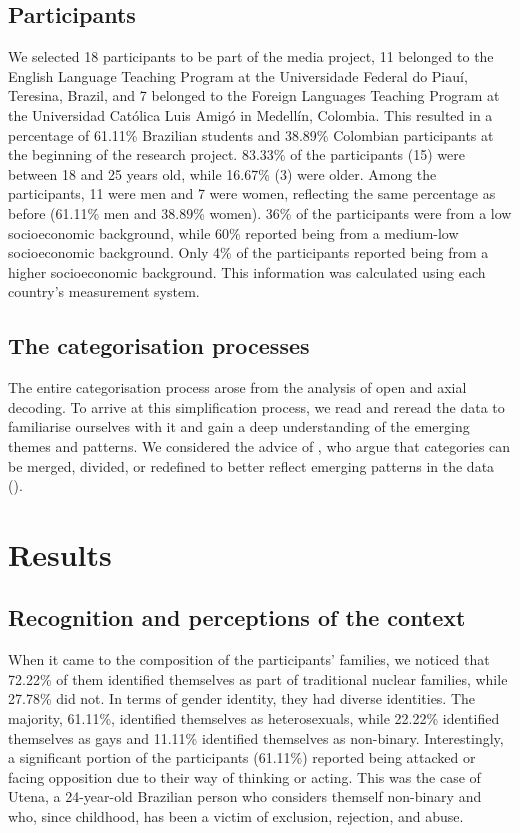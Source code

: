 \documentclass[english]{textolivre}
\begin{document}
\subsection{Participants}\label{sec-organizacao-latex}
We selected 18 participants to be part of the media project, 11 belonged to the English Language Teaching Program at the Universidade Federal do Piauí, Teresina, Brazil, and 7 belonged to the Foreign Languages Teaching Program at the Universidad Católica Luis Amigó in Medellín, Colombia. This resulted in a percentage of 61.11\% Brazilian students and 38.89\% Colombian participants at the beginning of the research project. 83.33\% of the participants (15) were between 18 and 25 years old, while 16.67\% (3) were older. Among the participants, 11 were men and 7 were women, reflecting the same percentage as before (61.11\% men and 38.89\% women). 36\% of the participants were from a low socioeconomic background, while 60\% reported being from a medium-low socioeconomic background. Only 4\% of the participants reported being from a higher socioeconomic background. This information was calculated using each country's measurement system.

\subsection{The categorisation processes}\label{sec-titulo}
The entire categorisation process arose from the analysis of open and axial decoding. To arrive at this simplification process, we read and reread the data to familiarise ourselves with it and gain a deep understanding of the emerging themes and patterns. We considered the advice of \textcite{miles1994qualitative}, who argue that categories can be merged, divided, or redefined to better reflect emerging patterns in the data ().



\section{Results}\label{sec-autores}
\subsection{Recognition and perceptions of the context}
When it came to the composition of the participants’ families, we noticed that 72.22\% of them identified themselves as part of traditional nuclear families, while 27.78\% did not. In terms of gender identity, they had diverse identities. The majority, 61.11\%, identified themselves as heterosexuals, while 22.22\% identified themselves as gays and 11.11\% identified themselves as non-binary. Interestingly, a significant portion of the participants (61.11\%) reported being attacked or facing opposition due to their way of thinking or acting. This was the case of Utena, a 24-year-old Brazilian person who considers themself non-binary and who, since childhood, has been a victim of exclusion, rejection, and abuse.
\end{document}
